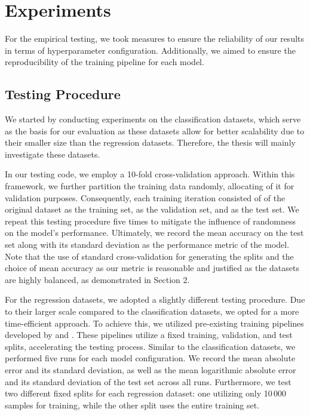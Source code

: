\section{Experiments}
For the empirical testing, we took measures to ensure the reliability of our results in terms of hyperparameter configuration. Additionally, we aimed to ensure the reproducibility of the training pipeline for each model.

\subsection{Testing Procedure}
We started by conducting experiments on the classification datasets, which serve as the basis for our evaluation as these datasets allow for better scalability due to their smaller size than the regression datasets. Therefore, the thesis will mainly investigate these datasets. 

In our testing code, we employ a 10-fold cross-validation approach. Within this framework, we further partition the training data randomly, allocating  of it for validation purposes. Consequently, each training iteration consisted of  of the original dataset as the training set,  as the validation set, and  as the test set. We repeat this testing procedure five times to mitigate the influence of randomness on the model's performance. Ultimately, we record the mean accuracy on the test set along with its standard deviation as the performance metric of the model. Note that the use of standard cross-validation for generating the splits and the choice of mean accuracy as our metric is reasonable and justified as the datasets are highly balanced, as demonstrated in Section 2.

For the regression datasets, we adopted a slightly different testing procedure. Due to their larger scale compared to the classification datasets, we opted for a more time-efficient approach. To achieve this, we utilized pre-existing training pipelines developed by \cite{Mor+2020} and \cite{Morris2022}. These pipelines utilize a fixed training, validation, and test splits, accelerating the testing process. Similar to the classification datasets, we performed five runs for each model configuration. We record the mean absolute error and its standard deviation, as well as the mean logarithmic absolute error and its standard deviation of the test set across all runs. Furthermore, we test two different fixed splits for each regression dataset: one utilizing only 10\,000 samples for training, while the other split uses the entire training set. 

